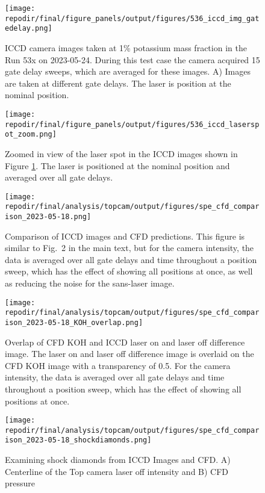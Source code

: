 \begin{figure}
    \centering
    \texttt{[image: \\repodir/final/figure\_panels/output/figures/536\_iccd\_img\_gatedelay.png]} 
    \caption{ICCD camera images taken at 1\% potassium mass fraction in the Run 53x on 2023-05-24. During this test case the camera acquired 15 gate delay sweeps, which are averaged for these images. A) Images are taken at different gate delays. The laser is position at the nominal position. }
    \label{fig:SI_536_iccd}
\end{figure}


\begin{figure}
    \centering
    \texttt{[image: \\repodir/final/figure\_panels/output/figures/536\_iccd\_laserspot\_zoom.png]} 
    \caption{Zoomed in view of the laser spot in the ICCD images shown in Figure \ref{fig:SI_536_iccd}. The laser is positioned at the nominal position and averaged over all gate delays.}
    \label{fig:SI_536_iccd_laserspot_zoom}
\end{figure}


\begin{figure}[]
\centering
\texttt{[image: \\repodir/final/analysis/topcam/output/figures/spe\_cfd\_comparison\_2023-05-18.png]}
\caption{Comparison of ICCD images and CFD predictions. This figure is similar to Fig.\ 2 in the main text, but for the camera intensity, the data is averaged over all gate delays and time throughout a position sweep, which has the effect of showing all positions at once, as well as reducing the noise for the sans-laser image.}
\label{fig:SI_iccd_cfd_comparison}%
\end{figure}


\begin{figure}[]
\centering
\texttt{[image: \\repodir/final/analysis/topcam/output/figures/spe\_cfd\_comparison\_2023-05-18\_KOH\_overlap.png]}
\caption{Overlap of CFD KOH and ICCD laser on and laser off difference image. The laser on and laser off difference image is overlaid on the CFD KOH image with a transparency of 0.5. For the camera intensity, the data is averaged over all gate delays and time throughout a position sweep, which has the effect of showing all positions at once.}
\label{fig:SI_iccd_cfd_comparison_KOH_overlap}
\end{figure}

\begin{figure}
    \centering
    \texttt{[image: \\repodir/final/analysis/topcam/output/figures/spe\_cfd\_comparison\_2023-05-18\_shockdiamonds.png]} 
    \caption{Examining shock diamonds from ICCD Images and CFD. A) Centerline of the Top camera laser off intensity and B) CFD pressure}
    \label{fig:SI_iccd_cfd_comparison_KOH}
\end{figure}

